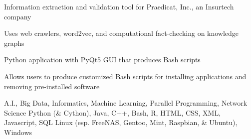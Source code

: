 \documentclass{acmresume}
\begin{document}
	   \begin{titemize}
           \item Information extraction and validation tool for Praedicat, Inc., an Insurtech company
           \item Uses web crawlers, word2vec, and computational fact-checking on knowledge graphs
       \end{titemize}
   
        \begin{titemize}
            \item Python application with PyQt5 GUI that produces Bash scripts
            \item Allows users to produce customized Bash scripts for installing applications and removing pre-installed software
        \end{titemize}
    
    
        \begin{description}[topsep=1pt,itemsep=1pt]
             A.I., Big Data, Informatics, Machine Learning, Parallel Programming, Network Science
             Python (\& Cython), Java, C++, Bash, R, HTML, CSS, XML, Javascript, SQL
             Linux (esp. FreeNAS, Gentoo, Mint, Raspbian, \& Ubuntu), Windows
        \end{description}

	
\end{document}
